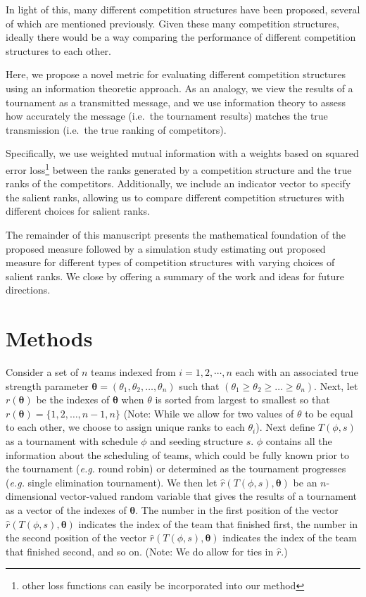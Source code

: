 \documentclass[
  12pt]{article}
\begin{document}
In light of this, many different competition structures have been
proposed, several of which are mentioned previously. Given these many
competition structures, ideally there would be a way comparing the
performance of different competition structures to each other.

Here, we propose a novel metric for evaluating different competition
structures using an information theoretic approach. As an analogy, we
view the results of a tournament as a transmitted message, and we use
information theory to assess how accurately the message (i.e.~the
tournament results) matches the true transmission (i.e.~the true ranking
of competitors).

Specifically, we use weighted mutual information with a weights based on
squared error loss\footnote{other loss functions can easily be
  incorporated into our method} between the ranks generated by a
competition structure and the true ranks of the competitors.
Additionally, we include an indicator vector to specify the salient
ranks, allowing us to compare different competition structures with
different choices for salient ranks.

The remainder of this manuscript presents the mathematical foundation of
the proposed measure followed by a simulation study estimating out
proposed measure for different types of competition structures with
varying choices of salient ranks. We close by offering a summary of the
work and ideas for future directions.

\section{Methods}\label{methods}

Consider a set of \(n\) teams indexed from \(i = 1, 2, \cdots, n\) each
with an associated true strength parameter
\(\boldsymbol{\theta} = (\theta_1, \theta_2, \ldots, \theta_n)\) such
that \((\theta_1 \ge \theta_2 \ge \ldots \ge \theta_n)\). Next, let
\(r(\boldsymbol{\theta})\) be the indexes of \(\boldsymbol{\theta}\)
when \(\theta\) is sorted from largest to smallest so that
\(r(\boldsymbol{\theta}) = \{1, 2, \ldots, n-1, n\}\) (Note: While we
allow for two values of \(\theta\) to be equal to each other, we choose
to assign unique ranks to each \(\theta_i\)). Next define \(T(\phi, s)\)
as a tournament with schedule \(\phi\) and seeding structure \(s\).
\(\phi\) contains all the information about the scheduling of teams,
which could be fully known prior to the tournament (\emph{e.g.} round
robin) or determined as the tournament progresses (\emph{e.g.} single
elimination tournament). We then let
\(\hat{r}(T(\phi, s),\boldsymbol{\theta})\) be an \(n\)-dimensional
vector-valued random variable that gives the results of a tournament as
a vector of the indexes of \(\boldsymbol{\theta}\). The number in the
first position of the vector \(\hat{r}(T(\phi, s),\boldsymbol{\theta})\)
indicates the index of the team that finished first, the number in the
second position of the vector
\(\hat{r}(T(\phi, s),\boldsymbol{\theta})\) indicates the index of the
team that finished second, and so on. (Note: We do allow for ties in
\(\hat{r}\).)
\end{document}
